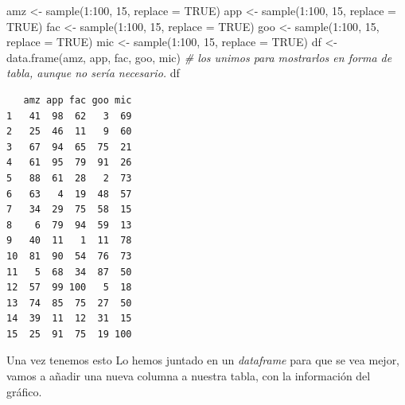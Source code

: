 \documentclass[
]{book}
\newenvironment{Shaded}{\begin{snugshade}}{\end{snugshade}}
\newcommand{\AttributeTok}[1]{\textcolor[rgb]{0.77,0.63,0.00}{#1}}
\newcommand{\CommentTok}[1]{\textcolor[rgb]{0.56,0.35,0.01}{\textit{#1}}}
\newcommand{\ConstantTok}[1]{\textcolor[rgb]{0.00,0.00,0.00}{#1}}
\newcommand{\DecValTok}[1]{\textcolor[rgb]{0.00,0.00,0.81}{#1}}
\newcommand{\FunctionTok}[1]{\textcolor[rgb]{0.00,0.00,0.00}{#1}}
\newcommand{\NormalTok}[1]{#1}
\newcommand{\OtherTok}[1]{\textcolor[rgb]{0.56,0.35,0.01}{#1}}
\newcommand{\SpecialCharTok}[1]{\textcolor[rgb]{0.00,0.00,0.00}{#1}}
\begin{document}
\begin{Shaded}
\begin{Highlighting}[]
\NormalTok{amz }\OtherTok{\textless{}{-}} \FunctionTok{sample}\NormalTok{(}\DecValTok{1}\SpecialCharTok{:}\DecValTok{100}\NormalTok{, }\DecValTok{15}\NormalTok{, }\AttributeTok{replace =} \ConstantTok{TRUE}\NormalTok{)}
\NormalTok{app }\OtherTok{\textless{}{-}} \FunctionTok{sample}\NormalTok{(}\DecValTok{1}\SpecialCharTok{:}\DecValTok{100}\NormalTok{, }\DecValTok{15}\NormalTok{, }\AttributeTok{replace =} \ConstantTok{TRUE}\NormalTok{)}
\NormalTok{fac }\OtherTok{\textless{}{-}} \FunctionTok{sample}\NormalTok{(}\DecValTok{1}\SpecialCharTok{:}\DecValTok{100}\NormalTok{, }\DecValTok{15}\NormalTok{, }\AttributeTok{replace =} \ConstantTok{TRUE}\NormalTok{)}
\NormalTok{goo }\OtherTok{\textless{}{-}} \FunctionTok{sample}\NormalTok{(}\DecValTok{1}\SpecialCharTok{:}\DecValTok{100}\NormalTok{, }\DecValTok{15}\NormalTok{, }\AttributeTok{replace =} \ConstantTok{TRUE}\NormalTok{)}
\NormalTok{mic }\OtherTok{\textless{}{-}} \FunctionTok{sample}\NormalTok{(}\DecValTok{1}\SpecialCharTok{:}\DecValTok{100}\NormalTok{, }\DecValTok{15}\NormalTok{, }\AttributeTok{replace =} \ConstantTok{TRUE}\NormalTok{)}
\NormalTok{df }\OtherTok{\textless{}{-}} \FunctionTok{data.frame}\NormalTok{(amz, app, fac, goo, mic)  }\CommentTok{\# los unimos para mostrarlos en forma de tabla, aunque no sería necesario.}
\NormalTok{df}
\end{Highlighting}
\end{Shaded}

\begin{verbatim}
   amz app fac goo mic
1   41  98  62   3  69
2   25  46  11   9  60
3   67  94  65  75  21
4   61  95  79  91  26
5   88  61  28   2  73
6   63   4  19  48  57
7   34  29  75  58  15
8    6  79  94  59  13
9   40  11   1  11  78
10  81  90  54  76  73
11   5  68  34  87  50
12  57  99 100   5  18
13  74  85  75  27  50
14  39  11  12  31  15
15  25  91  75  19 100
\end{verbatim}

Una vez tenemos esto Lo hemos juntado en un \emph{dataframe} para que se vea mejor, vamos a añadir una nueva columna a nuestra tabla, con la información del gráfico.

\begin{Shaded}
\end{Shaded}
\end{document}
